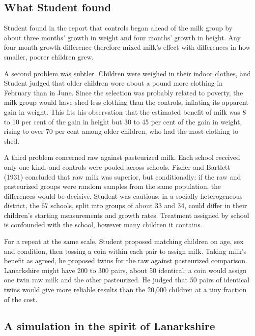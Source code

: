 \subsection{What Student found}

Student found in the report that controls began ahead of the milk group by about three months' growth in weight and four months' growth in height. Any four month growth difference therefore mixed milk's effect with differences in how smaller, poorer children grew.

A second problem was subtler. Children were weighed in their indoor clothes, and Student judged that older children wore about a pound more clothing in February than in June. Since the selection was probably related to poverty, the milk group would have shed less clothing than the controls, inflating its apparent gain in weight. This fits his observation that the estimated benefit of milk was 8 to 10 per cent of the gain in height but 30 to 45 per cent of the gain in weight, rising to over 70 per cent among older children, who had the most clothing to shed.

A third problem concerned raw against pasteurized milk. Each school received only one kind, and controls were pooled across schools. Fisher and Bartlett (1931) concluded that raw milk was superior, but conditionally: if the raw and pasteurized groups were random samples from the same population, the differences would be decisive. Student was cautious: in a socially heterogeneous district, the 67 schools, split into groups of about 33 and 34, could differ in their children's starting measurements and growth rates. Treatment assigned by school is confounded with the school, however many children it contains.

For a repeat at the same scale, Student proposed matching children on age, sex and condition, then tossing a coin within each pair to assign milk. Taking milk's benefit as agreed, he proposed twins for the raw against pasteurized comparison. Lanarkshire might have 200 to 300 pairs, about 50 identical; a coin would assign one twin raw milk and the other pasteurized. He judged that 50 pairs of identical twins would give more reliable results than the 20,000 children at a tiny fraction of the cost.

\subsection{A simulation in the spirit of Lanarkshire}

